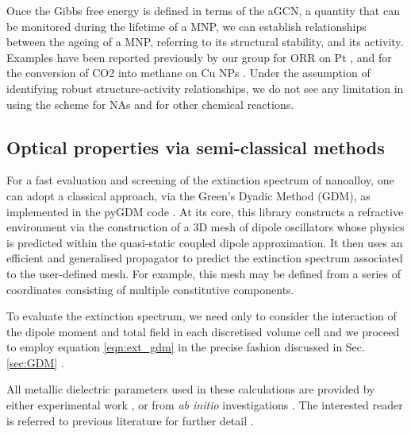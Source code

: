 Once the Gibbs free energy is defined in terms of the aGCN, a quantity that can be monitored during the lifetime of a MNP, we can establish relationships between the ageing of a MNP, referring to its structural stability, and its activity. Examples have been reported previously by our group for ORR on Pt \cite{Rossi2020}, and for the conversion of CO2 into methane on Cu NPs \cite{Gazzarrini2021}. Under the assumption of identifying robust structure-activity relationships, we do not see any limitation in using the scheme for NAs and for other chemical reactions.

\subsection{Optical properties via semi-classical methods}

For a fast evaluation and screening of the extinction spectrum of nanoalloy, one can adopt a classical approach, via the Green's Dyadic Method (GDM), \cite{GDM,Girard_2005} as implemented in the pyGDM code \cite{pyGDM,pyGDMarXiv}.
%
At its core, this library constructs a refractive environment via the construction of a 3D mesh of dipole oscillators whose physics is predicted within the quasi-static coupled dipole approximation.
%
It then uses an efficient and generalised propagator to predict the extinction spectrum associated to the user-defined mesh. For example, this mesh may be defined from a series of coordinates consisting of multiple constitutive components. 
%

To evaluate the extinction spectrum,  we need only to consider the interaction of the dipole moment and total field in each discretised volume cell and we proceed to employ equation \ref{eqn:ext_gdm} in the precise fashion discussed in Sec. \ref{sec:GDM} .

All metallic dielectric parameters used in these calculations are provided by either experimental work \cite{PhysRevB.6.4370,Rakic:98,PhysRevB.15.4115}, or from \textit{ab initio} investigations \cite{doi:10.1063/1.3243762}.
%
The interested reader is referred to previous literature for further detail \cite{GDM,pyGDM,pyGDMarXiv}.
%

